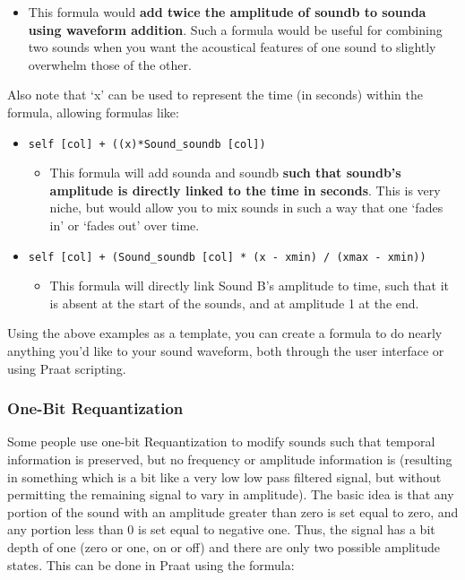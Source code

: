 \begin{itemize}
  \begin{itemize}
  \tightlist
  \item
    This formula would \textbf{add twice the amplitude of soundb to
    sounda using waveform addition}. Such a formula would be useful for
    combining two sounds when you want the acoustical features of one
    sound to slightly overwhelm those of the other.
  \end{itemize}
\end{itemize}

Also note that `x' can be used to represent the time (in seconds) within
the formula, allowing formulas like:

\begin{itemize}
\tightlist
\item
  \texttt{self [col] + ((x)*Sound\_soundb [col])}

  \begin{itemize}
  \tightlist
  \item
    This formula will add sounda and soundb \textbf{such that soundb's
    amplitude is directly linked to the time in seconds}. This is very
    niche, but would allow you to mix sounds in such a way that one
    `fades in' or `fades out' over time.
  \end{itemize}
\item
  \texttt{self [col] + (Sound\_soundb [col] * (x - xmin) / (xmax - xmin))}

  \begin{itemize}
  \tightlist
  \item
    This formula will directly link Sound B's amplitude to time, such
    that it is absent at the start of the sounds, and at amplitude 1 at
    the end.
  \end{itemize}
\end{itemize}

Using the above examples as a template, you can create a formula to do
nearly anything you'd like to your sound waveform, both through the user
interface or using Praat scripting.

\hypertarget{one-bit-requantization}{%
\subsubsection{One-Bit Requantization}\label{one-bit-requantization}}

Some people use one-bit Requantization to modify sounds such that
temporal information is preserved, but no frequency or amplitude
information is (resulting in something which is a bit like a very low
low pass filtered signal, but without permitting the remaining signal to
vary in amplitude). The basic idea is that any portion of the sound with
an amplitude greater than zero is set equal to zero, and any portion
less than 0 is set equal to negative one. Thus, the signal has a bit
depth of one (zero or one, on or off) and there are only two possible
amplitude states. This can be done in Praat using the formula:

